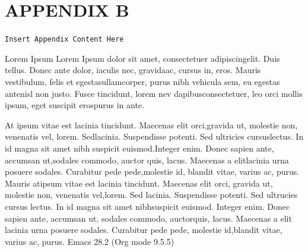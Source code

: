 \documentclass[openleft,oneside,showtrims]{memoir}
\begin{document}
\chapter{APPENDIX B}
\label{sec:org2de64d2}

\texttt{Insert Appendix Content Here}

Lorem Ipsum Lorem Ipsum dolor sit amet, consectetuer adipiscingelit. Duis tellus. Donec ante dolor, iaculis nec, gravidaac, cursus in, eros. Mauris vestibulum, felis et egestasullamcorper, purus nibh vehicula sem, eu egestas antenisl non justo. Fusce tincidunt, lorem nev dapibusconsectetuer, leo orci mollis ipsum, eget suscipit erospurus in ante.

At ipsum vitae est lacinia tincidunt. Maecenas elit orci,gravida ut, molestie non, venenatis vel, lorem. Sedlacinia. Suspendisse potenti. Sed ultricies cursuslectus. In id magna sit amet nibh suspicit euismod.Integer enim. Donec sapien ante, accumsan ut,sodales commodo, auctor quis, lacus. Maecenas a elitlacinia urna posuere sodales. Curabitur pede pede,molestie id, blandit vitae, varius ac, purus. Mauris atipsum vitae est lacinia tincidunt. Maecenas elit orci, gravida ut, molestie non, venenatis vel,lorem. Sed lacinia. Suspendisse potenti. Sed ultrucies cursus lectus. In id magna sit amet nibhsuspicit euismod. Integer enim. Donec sapien ante, accumsan ut, sodales commodo, auctorquis, lacus. Maecenas a elit lacinia urna posuere sodales. Curabitur pede pede, molestie id,blandit vitae, varius ac, purus.
Emacs 28.2 (Org mode 9.5.5)
\end{document}
